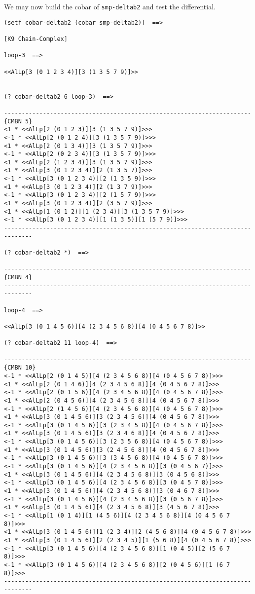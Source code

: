 We may now build the cobar of {\tt smp-deltab2} and test the differential. 
{\footnotesize \begin{verbatim}
(setf cobar-deltab2 (cobar smp-deltab2))  ==>

[K9 Chain-Complex]

loop-3  ==>

<<AlLp[3 (0 1 2 3 4)][3 (1 3 5 7 9)]>>


(? cobar-deltab2 6 loop-3)  ==>

----------------------------------------------------------------------{CMBN 5}
<1 * <<AlLp[2 (0 1 2 3)][3 (1 3 5 7 9)]>>>
<-1 * <<AlLp[2 (0 1 2 4)][3 (1 3 5 7 9)]>>>
<1 * <<AlLp[2 (0 1 3 4)][3 (1 3 5 7 9)]>>>
<-1 * <<AlLp[2 (0 2 3 4)][3 (1 3 5 7 9)]>>>
<1 * <<AlLp[2 (1 2 3 4)][3 (1 3 5 7 9)]>>>
<1 * <<AlLp[3 (0 1 2 3 4)][2 (1 3 5 7)]>>>
<-1 * <<AlLp[3 (0 1 2 3 4)][2 (1 3 5 9)]>>>
<1 * <<AlLp[3 (0 1 2 3 4)][2 (1 3 7 9)]>>>
<-1 * <<AlLp[3 (0 1 2 3 4)][2 (1 5 7 9)]>>>
<1 * <<AlLp[3 (0 1 2 3 4)][2 (3 5 7 9)]>>>
<1 * <<AlLp[1 (0 1 2)][1 (2 3 4)][3 (1 3 5 7 9)]>>>
<-1 * <<AlLp[3 (0 1 2 3 4)][1 (1 3 5)][1 (5 7 9)]>>>
------------------------------------------------------------------------------

(? cobar-deltab2 *)  ==>

----------------------------------------------------------------------{CMBN 4}
------------------------------------------------------------------------------

loop-4  ==>

<<AlLp[3 (0 1 4 5 6)][4 (2 3 4 5 6 8)][4 (0 4 5 6 7 8)]>>

(? cobar-deltab2 11 loop-4)  ==>

----------------------------------------------------------------------{CMBN 10}
<-1 * <<AlLp[2 (0 1 4 5)][4 (2 3 4 5 6 8)][4 (0 4 5 6 7 8)]>>>
<1 * <<AlLp[2 (0 1 4 6)][4 (2 3 4 5 6 8)][4 (0 4 5 6 7 8)]>>>
<-1 * <<AlLp[2 (0 1 5 6)][4 (2 3 4 5 6 8)][4 (0 4 5 6 7 8)]>>>
<1 * <<AlLp[2 (0 4 5 6)][4 (2 3 4 5 6 8)][4 (0 4 5 6 7 8)]>>>
<-1 * <<AlLp[2 (1 4 5 6)][4 (2 3 4 5 6 8)][4 (0 4 5 6 7 8)]>>>
<1 * <<AlLp[3 (0 1 4 5 6)][3 (2 3 4 5 6)][4 (0 4 5 6 7 8)]>>>
<-1 * <<AlLp[3 (0 1 4 5 6)][3 (2 3 4 5 8)][4 (0 4 5 6 7 8)]>>>
<1 * <<AlLp[3 (0 1 4 5 6)][3 (2 3 4 6 8)][4 (0 4 5 6 7 8)]>>>
<-1 * <<AlLp[3 (0 1 4 5 6)][3 (2 3 5 6 8)][4 (0 4 5 6 7 8)]>>>
<1 * <<AlLp[3 (0 1 4 5 6)][3 (2 4 5 6 8)][4 (0 4 5 6 7 8)]>>>
<-1 * <<AlLp[3 (0 1 4 5 6)][3 (3 4 5 6 8)][4 (0 4 5 6 7 8)]>>>
<-1 * <<AlLp[3 (0 1 4 5 6)][4 (2 3 4 5 6 8)][3 (0 4 5 6 7)]>>>
<1 * <<AlLp[3 (0 1 4 5 6)][4 (2 3 4 5 6 8)][3 (0 4 5 6 8)]>>>
<-1 * <<AlLp[3 (0 1 4 5 6)][4 (2 3 4 5 6 8)][3 (0 4 5 7 8)]>>>
<1 * <<AlLp[3 (0 1 4 5 6)][4 (2 3 4 5 6 8)][3 (0 4 6 7 8)]>>>
<-1 * <<AlLp[3 (0 1 4 5 6)][4 (2 3 4 5 6 8)][3 (0 5 6 7 8)]>>>
<1 * <<AlLp[3 (0 1 4 5 6)][4 (2 3 4 5 6 8)][3 (4 5 6 7 8)]>>>
<-1 * <<AlLp[1 (0 1 4)][1 (4 5 6)][4 (2 3 4 5 6 8)][4 (0 4 5 6 7 8)]>>>
<1 * <<AlLp[3 (0 1 4 5 6)][1 (2 3 4)][2 (4 5 6 8)][4 (0 4 5 6 7 8)]>>>
<1 * <<AlLp[3 (0 1 4 5 6)][2 (2 3 4 5)][1 (5 6 8)][4 (0 4 5 6 7 8)]>>>
<-1 * <<AlLp[3 (0 1 4 5 6)][4 (2 3 4 5 6 8)][1 (0 4 5)][2 (5 6 7 8)]>>>
<-1 * <<AlLp[3 (0 1 4 5 6)][4 (2 3 4 5 6 8)][2 (0 4 5 6)][1 (6 7 8)]>>>
------------------------------------------------------------------------------


\end{verbatim}}
